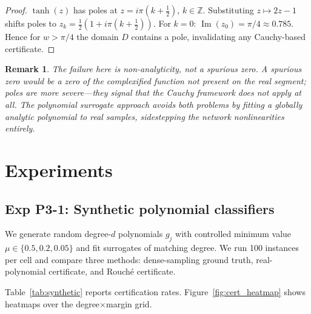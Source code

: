 \documentclass{article}
\newtheorem{remark}{Remark}
\theoremstyle{definition}
\begin{document}
\begin{proof}
  $\tanh(z)$ has poles at $z = i\pi(k+\tfrac{1}{2})$, $k\in\mathbb{Z}$.
  Substituting $z\mapsto 2z-1$ shifts poles to $z_k = \tfrac{1}{2}(1+i\pi(k+\tfrac{1}{2}))$.
  For $k=0$: $\operatorname{Im}(z_0) = \pi/4\approx 0.785$.  Hence for $w>\pi/4$ the domain
  $D$ contains a pole, invalidating any Cauchy-based certificate.
\end{proof}

\begin{remark}
  The failure here is \emph{non-analyticity}, not a spurious zero.  A spurious
  zero would be a zero of the complexified function not present on the real
  segment; poles are more severe---they signal that the Cauchy framework does
  not apply at all.  The polynomial surrogate approach avoids both problems by
  fitting a globally analytic polynomial to real samples, sidestepping the
  network nonlinearities entirely.
\end{remark}

\section{Experiments}
\label{sec:experiments}

\subsection{Exp P3-1: Synthetic polynomial classifiers}
\label{sec:exp_synthetic}

We generate random degree-$d$ polynomials $g_j$ with controlled minimum
value $\mu\in\{0.5, 0.2, 0.05\}$ and fit surrogates of matching degree.
We run 100 instances per cell and compare three methods: dense-sampling
ground truth, real-polynomial certificate, and Rouch\'e certificate.

Table~\ref{tab:synthetic} reports certification rates.
Figure~\ref{fig:cert_heatmap} shows heatmaps over the degree$\times$margin grid.
\end{document}
